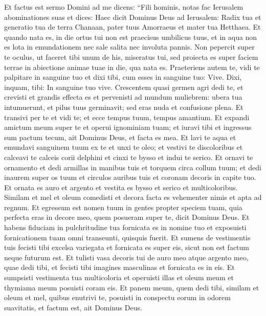 \begin{biblechapter}  
\verse Et factus est sermo Domini ad me dicens: 
\verse “Fili hominis, notas fac Ierusalem abominationes suas 
\verse et dices: Haec dicit Dominus Deus ad Ierusalem: Radix tua et generatio tua de terra Chanaan, pater tuus Amorraeus et mater tua Hetthaea. 
\verse Et quando nata es, in die ortus tui non est praecisus umbilicus tuus, et in aqua non es lota in emundationem nec sale salita nec involuta pannis. 
\verse Non pepercit super te oculus, ut faceret tibi unum de his, miseratus tui, sed proiecta es super faciem terrae in abiectione animae tuae in die, qua nata es. 
\verse Praeteriens autem te, vidi te palpitare in sanguine tuo et dixi tibi, cum esses in sanguine tuo: Vive. Dixi, inquam, tibi: In sanguine tuo vive. 
\verse Crescentem quasi germen agri dedi te, et crevisti et grandis effecta es et pervenisti ad mundum muliebrem: ubera tua intumuerunt, et pilus tuus germinavit; sed eras nuda et confusione plena. 
\verse Et transivi per te et vidi te; et ecce tempus tuum, tempus amantium. Et expandi amictum meum super te et operui ignominiam tuam; et iuravi tibi et ingressus sum pactum tecum, ait Dominus Deus, et facta es mea. 
\verse Et lavi te aqua et emundavi sanguinem tuum ex te et unxi te oleo; 
\verse et vestivi te discoloribus et calceavi te calceis corii delphini et cinxi te bysso et indui te serico. 
\verse Et ornavi te ornamento et dedi armillas in manibus tuis et torquem circa collum tuum; 
\verse et dedi inaurem super os tuum et circulos auribus tuis et coronam decoris in capite tuo. 
\verse Et ornata es auro et argento et vestita es bysso et serico et multicoloribus. Similam et mel et oleum comedisti et decora facta es vehementer nimis et apta ad regnum. 
\verse Et egressum est nomen tuum in gentes propter speciem tuam, quia perfecta eras in decore meo, quem posueram super te, dicit Dominus Deus. 
\verse Et habens fiduciam in pulchritudine tua fornicata es in nomine tuo et exposuisti fornicationem tuam omni transeunti, quisquis fuerit. 
\verse Et sumens de vestimentis tuis fecisti tibi excelsa variegata et fornicata es super eis, sicut non est factum neque futurum est. 
\verse Et tulisti vasa decoris tui de auro meo atque argento meo, quae dedi tibi, et fecisti tibi imagines masculinas et fornicata es in eis. 
\verse Et sumpsisti vestimenta tua multicoloria et operuisti illas et oleum meum et thymiama meum posuisti coram eis. 
\verse Et panem meum, quem dedi tibi, similam et oleum et mel, quibus enutrivi te, posuisti in conspectu eorum in odorem suavitatis, et factum est, ait Dominus Deus. 

\end{biblechapter}
